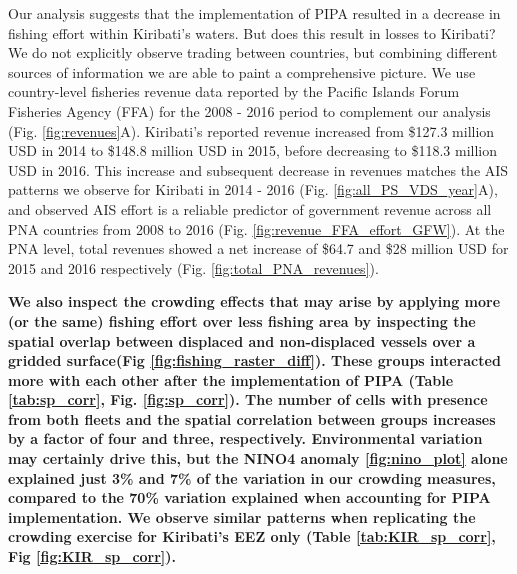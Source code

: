 \documentclass[12pt]{article}
\begin{document}
Our analysis suggests that the implementation of PIPA resulted in a decrease in fishing effort within Kiribati's waters. But does this result in losses to Kiribati? We do not explicitly observe trading between countries, but combining different sources of information we are able to paint a comprehensive picture. We use country-level fisheries revenue data reported by the Pacific Islands Forum Fisheries Agency (FFA) for the 2008 - 2016 period to complement our analysis (Fig. \ref{fig:revenues}A). Kiribati's reported revenue increased from \$127.3 million USD in 2014 to \$148.8 million USD in 2015, before decreasing to \$118.3 million USD in 2016. This increase and subsequent decrease in revenues matches the AIS patterns we observe for Kiribati in 2014 - 2016 (Fig. \ref{fig:all_PS_VDS_year}A), and observed AIS effort is a reliable predictor of government revenue across all PNA countries from 2008 to 2016 (Fig. \ref{fig:revenue_FFA_effort_GFW}). At the PNA level, total revenues showed a net increase of \$64.7 and \$28 million USD for 2015 and 2016 respectively (Fig. \ref{fig:total_PNA_revenues}).

\textbf{We also inspect the crowding effects that may arise by applying more (or the same) fishing effort over less fishing area by inspecting the spatial overlap between displaced and non-displaced vessels over a gridded surface(Fig \ref{fig:fishing_raster_diff}). These groups interacted more with each other after the implementation of PIPA (Table \ref{tab:sp_corr}, Fig. \ref{fig:sp_corr}). The number of cells with presence from both fleets and the spatial correlation between groups increases by a factor of four and three, respectively. Environmental variation may certainly drive this, but the NINO4 anomaly \ref{fig:nino_plot} alone explained just 3\% and 7\% of the variation in our crowding measures, compared to the 70\% variation explained when accounting for PIPA implementation. We observe similar patterns when replicating the crowding exercise for Kiribati's EEZ only (Table \ref{tab:KIR_sp_corr}, Fig \ref{fig:KIR_sp_corr}).}
\end{document}
